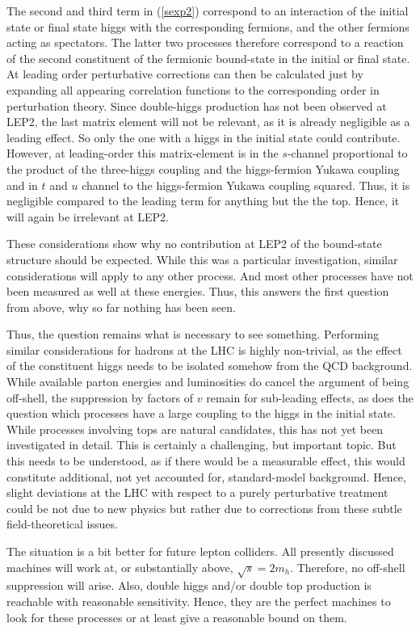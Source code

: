 \documentclass[final,12pt,3p,longtitle]{elsarticle}
\newcommand*{\pref}[1]{(\ref{#1})}
\newcommand*{\1}{1\!\!\!\bot}
\begin{document}
The second and third term in \pref{sexp2} correspond to an interaction of the initial state or final state higgs with the corresponding fermions, and the other fermions acting as spectators. The latter two processes therefore correspond to a reaction of the second constituent of the fermionic bound-state in the initial or final state. At leading order perturbative corrections can then be calculated just by expanding all appearing correlation functions to the corresponding order in perturbation theory. Since double-higgs production has not been observed at LEP2, the last matrix element will not be relevant, as it is already negligible as a leading effect. So only the one with a higgs in the initial state could contribute. However, at leading-order this matrix-element is in the $s$-channel proportional to the product of the three-higgs coupling and the higgs-fermion Yukawa coupling and in $t$ and $u$ channel to the higgs-fermion Yukawa coupling squared. Thus, it is negligible compared to the leading term for anything but the the top. Hence, it will again be irrelevant at LEP2.

These considerations show why no contribution at LEP2 of the bound-state structure should be expected. While this was a particular investigation, similar considerations will apply to any other process. And most other processes have not been measured as well at these energies. Thus, this answers the first question from above, why so far nothing has been seen.

Thus, the question remains what is necessary to see something. Performing similar considerations for hadrons at the LHC is highly non-trivial, as the effect of the constituent higgs needs to be isolated somehow from the QCD background. While available parton energies and luminosities do cancel the argument of being off-shell, the suppression by factors of $v$ remain for sub-leading effects, as does the question which processes have a large coupling to the higgs in the initial state. While processes involving tops are natural candidates, this has not yet been investigated in detail. This is certainly a challenging, but important topic. But this needs to be understood, as if there would be a measurable effect, this would constitute additional, not yet accounted for, standard-model background. Hence, slight deviations at the LHC with respect to a purely perturbative treatment could be not due to new physics but rather due to corrections from these subtle field-theoretical issues.

The situation is a bit better for future lepton colliders. All presently discussed machines will work at, or substantially above, $\sqrt{s}=2m_h$. Therefore, no off-shell suppression will arise. Also, double higgs and/or double top production is reachable with reasonable sensitivity. Hence, they are the perfect machines to look for these processes or at least give a reasonable bound on them.
\end{document}
